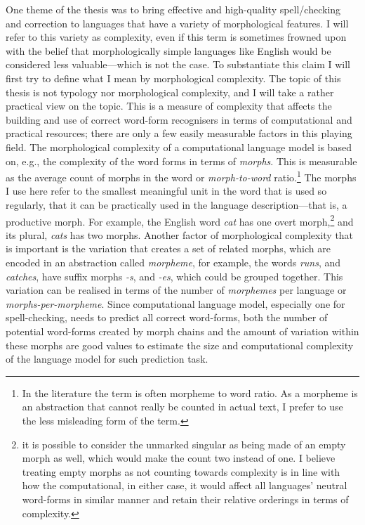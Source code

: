 \documentclass[officiallayout]{unihelcompling}
\begin{document}
One theme of the thesis was to bring effective and high-quality spell\-/checking
and correction to languages that have a variety of morphological features. I
will refer to this variety as complexity, even if this term is sometimes
frowned upon with the belief that morphologically simple languages like English
would be considered less valuable---which is not the case.  To substantiate
this claim I will first try to define what I mean by morphological complexity.
The topic of this thesis is not typology nor morphological complexity, and I
will take a rather practical view on the topic.  This is a measure of
complexity that affects the building and use of correct word-form recognisers
in terms of computational and practical resources; there are only a few easily
measurable factors in this playing field. The morphological complexity of a
computational language model is based on, e.g., the complexity of the word
forms in terms of \emph{morphs}.
This is measurable as the average count of morphs in the word or
\emph{morph-to-word}
ratio.\footnote{In the literature the term is often morpheme to word ratio. As a
morpheme is an abstraction that cannot really be counted in actual text, I
prefer to use the less misleading form of the term.} The morphs I use here
refer to the smallest meaningful unit in the word that is used so regularly,
that it can be practically used in the language description---that is, a
productive morph. For example, the English word \emph{cat} has one overt morph,\footnote{it is possible to consider the unmarked singular as being made of an empty morph
as well, which would make the count two instead of one. I believe treating
empty morphs as not counting towards complexity is in line with how the 
computational, in either case, it would affect all languages' neutral word-forms
in similar manner and retain their relative orderings in terms of complexity.} and
its plural, \emph{cats} has two morphs.  Another factor of morphological
complexity that is important is the variation that creates a set of related
morphs, which are encoded in an abstraction called \emph{morpheme}, for
example, the words \emph{runs}, and \emph{catches}, have suffix morphs
\emph{-s}, and \emph{-es}, which could be grouped together. This variation can
be realised in terms of the number of \emph{morphemes} per language or
\emph{morphs-per-morpheme}. Since computational language model, especially
one for spell-checking, needs to predict all correct word-forms, both the
number of potential word-forms created by morph chains and the amount of
variation within these morphs are good values to estimate the size and
computational complexity of the language model for such prediction task.
\end{document}
